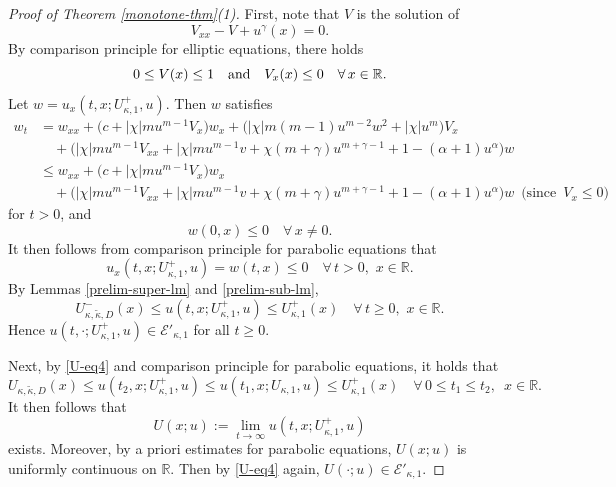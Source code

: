 \documentclass[11pt]{article} %
\theoremstyle{remark}
\theoremstyle{remark}
\numberwithin{equation}{section}
\numberwithin{figure}{section}
\numberwithin{table}{section}
\newcommand\RR{\ensuremath{\mathbb{R}}}
\begin{document}
\begin{proof}[Proof of Theorem \ref{monotone-thm}(1)]
\smallskip



First, 
note that $V$ is the solution of
$$
V_{xx}-V+u^\gamma(x)=0.
$$
By comparison principle for elliptic equations, there holds
$$
0\le V(x)\le 1\quad {\rm and}\quad 
V_x(x)\le 0\quad  \forall \, x\in\RR.
$$
 Let $w=u_x(t,x; U_{\kappa,1}^+, u)$. Then $w$ satisfies
\begin{align*}
w_t&= w_{xx}+\big(c+|\chi| m u^{m-1} V_x\big)w_x  +\big(|\chi| m (m-1)u^{m-2} w^2
+|\chi|u^m\big)V_x\\
&\quad +\Big(|\chi| m u^{m-1} V_{xx}+|\chi| mu^{m-1} v+\chi (m+\gamma) u^{m+\gamma -1}+1 -(\alpha+1) u^\alpha\Big)w\\
&\le w_{xx}+\big(c+|\chi| m u^{m-1} V_x\big)w_x  \\
&\quad +\Big(|\chi| m u^{m-1} V_{xx}+|\chi| mu^{m-1} v+\chi (m+\gamma) u^{m+\gamma -1}+1 -(\alpha+1) u^\alpha\Big)w\,\,\, 
  \text{(since}\,\,  \,  V_x\le 0)
\end{align*}
for $t>0$, 
and
$$
w(0,x)\le 0\quad \forall\, x\not =0.
$$
It then follows from comparison principle for parabolic equations that
\begin{equation}
\label{U-eq3}
u_x(t,x;U_{\kappa,1}^+, u)=w(t,x)\le 0\quad \forall\, t>0, \,\,  x\in\RR.
\end{equation}
By Lemmas \ref{prelim-super-lm} and \ref{prelim-sub-lm}, 
\begin{equation}
\label{U-eq4}
U_{\kappa,\tilde\kappa,D}^-(x)\le u(t,x;U_{\kappa,1}^+, u)\le U_{\kappa,1}^+(x)\quad \forall\,  t\ge 0,\,\, x\in\RR.
\end{equation}
Hence $u(t,\cdot;U_{\kappa,1}^+,u)\in\mathcal{E}'_{\kappa, 1}$ for all $t\ge 0$.



Next, by \eqref{U-eq4} and comparison principle for parabolic equations, it holds that
\begin{equation*}
U_{\kappa,\tilde\kappa,D}(x)\le u(t_2,x;U_{\kappa,1}^+,u)\le u(t_1,x;U_{\kappa,1},u)\le U_{\kappa,1}^+(x)\quad \forall\, 0\le t_1\le t_2,\,\,\, x\in\RR.
\end{equation*}
It then follows that
$$
U(x;u):=\lim_{t\to\infty} u(t,x;U_{\kappa,1}^+,u)
$$
exists. Moreover, by a priori estimates for parabolic equations, $U(x;u)$ is uniformly continuous on $\RR$. Then by \eqref{U-eq4} again, $U(\cdot;u)\in\mathcal{E}'_{\kappa,1}$.








\medskip


\end{proof}
\end{document}
